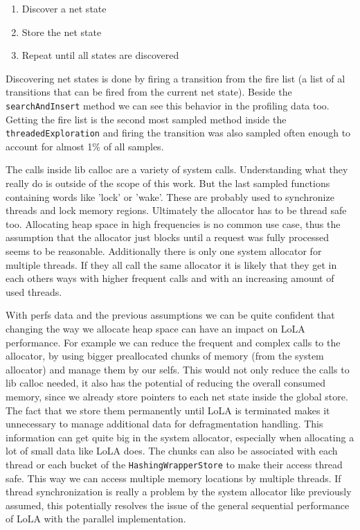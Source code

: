 \begin{enumerate}
    \item Discover a net state
    \item Store the net state
    \item Repeat until all states are discovered
\end{enumerate}
Discovering net states is done by firing a transition from the fire list (a list of al transitions that can be fired from the current net state). Beside the \texttt{searchAndInsert} method we can see this behavior in the profiling data too. Getting the fire list is the second most sampled method inside the \texttt{threadedExploration} and firing the transition was also sampled often enough to account for almost 1\% of all samples.

The calls inside lib calloc are a variety of system calls. Understanding what they really do is outside of the scope of this work. But the last sampled functions containing words like 'lock' or 'wake'. These are probably used to synchronize threads and lock memory regions. Ultimately the allocator has to be thread safe too. Allocating heap space in high frequencies is no common use case, thus the assumption that the allocator just blocks until a request was fully processed seems to be reasonable. Additionally there is only one system allocator for multiple threads. If they all call the same allocator it is likely that they get in each others ways with higher frequent calls and with an increasing amount of used threads.

With perfs data and the previous assumptions we can be quite confident that changing the way we allocate heap space can have an impact on LoLA performance. For example we can reduce the frequent and complex calls to the allocator, by using bigger preallocated chunks of memory (from the system allocator) and manage them by our selfs. This would not only reduce the calls to lib calloc needed, it also has the potential of reducing the overall consumed memory, since we already store pointers to each net state inside the global store. The fact that we store them permanently until LoLA is terminated makes it unnecessary to manage additional data for defragmentation handling. This information can get quite big in the system allocator, especially when allocating a lot of small data like LoLA does. The chunks can also be associated with each thread or each bucket of the \texttt{HashingWrapperStore} to make their access thread safe. This way we can access multiple memory locations by multiple threads. If thread synchronization is really a problem by the system allocator like previously assumed, this potentially resolves the issue of the general sequential performance of LoLA with the parallel implementation.

